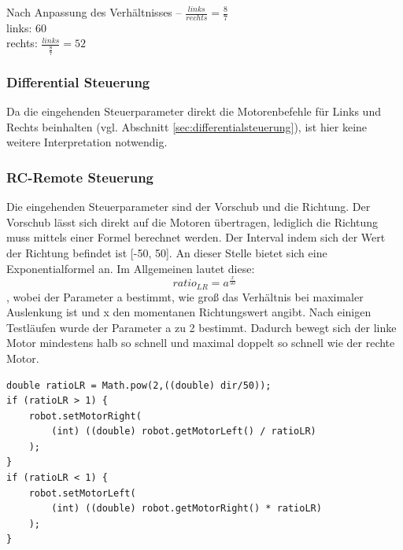 Nach Anpassung des Verhältnisses -- $\frac{links}{rechts} = \frac{8}{7}$ \\
	links: 60 \\
	rechts: $\frac{links}{\frac{8}{7}} = 52$


\subsubsection{Differential Steuerung}
Da die eingehenden Steuerparameter direkt die Motorenbefehle für Links und Rechts beinhalten (vgl. Abschnitt \ref{sec:differentialsteuerung}), ist hier keine weitere Interpretation notwendig. 

\subsubsection{RC-Remote Steuerung}
\label{sec:rcremote_server}
Die eingehenden Steuerparameter sind der Vorschub und die Richtung. Der Vorschub lässt sich direkt auf die Motoren übertragen, lediglich die Richtung muss mittels einer Formel berechnet werden. Der Interval indem sich der Wert der Richtung befindet ist [-50, 50]. An dieser Stelle bietet sich eine Exponentialformel an. 
Im Allgemeinen lautet diese: 
{\Large \[ratio_{LR} = a^{\frac{x}{50}}\]},
wobei der Parameter a bestimmt, wie groß das Verhältnis bei maximaler Auslenkung ist und x den momentanen Richtungswert angibt.
Nach einigen Testläufen wurde der Parameter a zu 2 bestimmt. Dadurch bewegt sich der linke Motor mindestens halb so schnell und maximal doppelt so schnell wie der rechte Motor.

\begin{lstlisting}
double ratioLR = Math.pow(2,((double) dir/50));
if (ratioLR > 1) {
	robot.setMotorRight(
		(int) ((double) robot.getMotorLeft() / ratioLR)
	); 
}
if (ratioLR < 1) {
	robot.setMotorLeft(
		(int) ((double) robot.getMotorRight() * ratioLR)
	);
}
\end{lstlisting}


